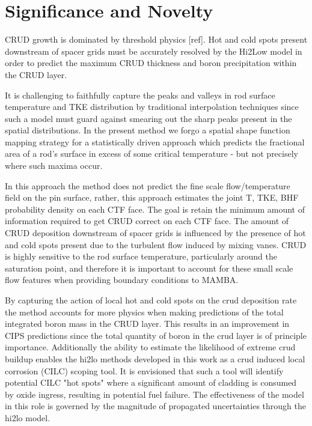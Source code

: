 \section{Significance and Novelty}


CRUD growth is dominated by threshold physics [ref].  Hot and cold spots
present downstream of spacer grids must be accurately resolved by the Hi2Low model
in order to predict the maximum CRUD
thickness and boron precipitation within the CRUD layer.  

It is challenging to faithfully capture the peaks and valleys in
rod surface temperature and TKE distribution by traditional interpolation
techniques since such a model must guard against smearing out the sharp peaks
present in the spatial distributions.  
In the present method we forgo a spatial shape function mapping strategy
for a statistically driven approach which predicts the fractional
area of a rod's surface in excess of some critical temperature - but not
precisely where such maxima occur.

In this approach the method does not predict the fine scale flow/temperature field on the pin surface, rather, this approach estimates the joint T, TKE, BHF probability density on each CTF face.  The goal is retain the minimum amount of information required to get CRUD correct on each CTF face.  The amount of CRUD deposition downstream of spacer grids is influenced by the presence of hot and cold spots present due to the turbulent flow induced by mixing vanes.  CRUD is highly sensitive to the rod surface temperature, particularly around the saturation point, and therefore it is important to account for these small scale flow features when providing boundary conditions to MAMBA.

By capturing the action of local hot and cold spots on the crud deposition rate the method accounts for more physics when making predictions of the total integrated boron mass in the CRUD layer.  This results in an improvement in CIPS predictions since the total quantity of boron in the crud layer is of principle importance.  Additionally the ability to estimate the likelihood of extreme crud buildup enables the hi2lo methods developed in this work as a crud induced local corrosion (CILC) scoping tool.  It is envisioned that such a tool will identify potential CILC "hot spots" where a significant amount of cladding is consumed by oxide ingress, resulting in potential fuel failure.  The effectiveness of the model in this role is governed by the magnitude of propagated uncertainties through the hi2lo model.



